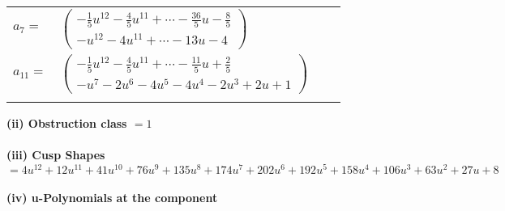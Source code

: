 \documentclass[1p]{elsarticle_modified}
\theoremstyle{definition}
\begin{document}
\begin{tabular}{m{7pt} m{180pt} m{7pt} m{180pt} }
\flushright $a_{7}=$&$\begin{pmatrix}-\frac{1}{5} u^{12}-\frac{4}{5} u^{11}+\cdots-\frac{36}{5} u-\frac{8}{5}\\- u^{12}-4 u^{11}+\cdots-13 u-4\end{pmatrix}$ \\
\flushright $a_{11}=$&$\begin{pmatrix}-\frac{1}{5} u^{12}-\frac{4}{5} u^{11}+\cdots-\frac{11}{5} u+\frac{2}{5}\\- u^7-2 u^6-4 u^5-4 u^4-2 u^3+2 u+1\end{pmatrix}$\\&\end{tabular}
\flushleft \textbf{(ii) Obstruction class $= 1$}\\~\\
\flushleft \textbf{(iii) Cusp Shapes $= 4 u^{12}+12 u^{11}+41 u^{10}+76 u^9+135 u^8+174 u^7+202 u^6+192 u^5+158 u^4+106 u^3+63 u^2+27 u+8$}\\~\\
\newpage\renewcommand{\arraystretch}{1}
\flushleft \textbf{(iv) u-Polynomials at the component}\newline \\
\end{document}
